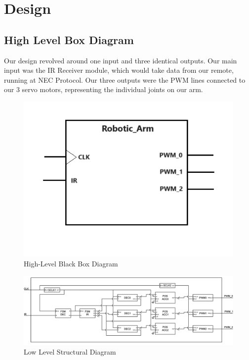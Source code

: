\documentclass[
    a4paper, %
	12pt, %
    ]{CSSullivanBusinessReport}
\begin{document}
\section{Design} %

\subsection{High Level Box Diagram} %
Our design revolved around one input and three identical outputs. Our main input was the IR Receiver module, which would take data from our remote, running at NEC Protocol. Our three outputs were the PWM lines connected to our 3 servo motors, representing the individual joints on our arm.


\begin{figure}[h]
    \centering
    \includegraphics[width=.8\textwidth]{Figures/HLBBD.png}
    \caption[center]{High-Level Black Box Diagram}
    \label{fig:highlevelblockdiagram}
\end{figure}


    \begin{figure}[h]
        \centering
        \includegraphics[width=.8\pdfpagewidth]{Figures/High Level Diagram V2.png}
        \caption{Low Level Structural Diagram}
        \label{fig:lowlevelblockdiagram}
    \end{figure}
    
\end{document}
